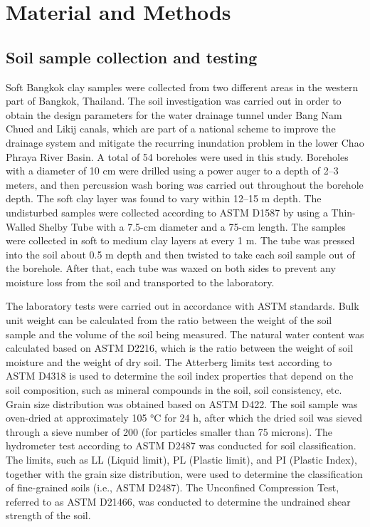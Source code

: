 \documentclass[12pt,a4paper]{article}
\begin{document}
	
	
	\section{Material and Methods}
	
	\subsection{Soil sample collection and testing}
	
	Soft Bangkok clay samples were collected from two different areas in the western part of Bangkok, Thailand. The soil investigation was carried out in order to obtain the design parameters for the water drainage tunnel under Bang Nam Chued and Likij canals, which are part of a national scheme to improve the drainage system and mitigate the recurring inundation problem in the lower Chao Phraya River Basin. A total of 54 boreholes were used in this study. Boreholes with a diameter of 10 cm were drilled using a power auger to a depth of 2–3 meters, and then percussion wash boring was carried out throughout the borehole depth. The soft clay layer was found to vary within 12–15 m depth. The undisturbed samples were collected according to ASTM D1587 by using a Thin-Walled Shelby Tube with a 7.5-cm diameter and a 75-cm length. The samples were collected in soft to medium clay layers at every 1 m. The tube was pressed into the soil about 0.5 m depth and then twisted to take each soil sample out of the borehole. After that, each tube was waxed on both sides to prevent any moisture loss from the soil and transported to the laboratory.
	
	The laboratory tests were carried out in accordance with ASTM standards. Bulk unit weight can be calculated from the ratio between the weight of the soil sample and the volume of the soil being measured. The natural water content was calculated based on ASTM D2216, which is the ratio between the weight of soil moisture and the weight of dry soil. The Atterberg limits test according to ASTM D4318 is used to determine the soil index properties that depend on the soil composition, such as mineral compounds in the soil, soil consistency, etc. Grain size distribution was obtained based on ASTM D422. The soil sample was oven-dried at approximately 105 °C for 24 h, after which the dried soil was sieved through a sieve number of 200 (for particles smaller than 75 microns). The hydrometer test according to ASTM D2487 was conducted for soil classification. The limits, such as LL (Liquid limit), PL (Plastic limit), and PI (Plastic Index), together with the grain size distribution, were used to determine the classification of fine-grained soils (i.e., ASTM D2487). The Unconfined Compression Test, referred to as ASTM D21466, was conducted to determine the undrained shear strength of the soil.
	
\end{document}

